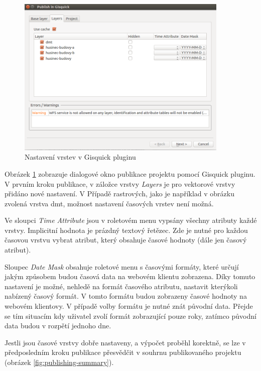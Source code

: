 \begin{figure}[h!]
\centering
\includegraphics[width=0.9\textwidth]{../img/gisquick-plugin.png}
\caption{Nastavení vrstev v Gisquick pluginu}
\label{fig:gisquick-plugin-layers}
\end{figure}

Obrázek \ref{fig:gisquick-plugin-layers} zobrazuje dialogové okno publikace
projektu pomocí Gisquick pluginu. V prvním kroku publikace, v záložce
vrstvy \textit{Layers} je pro vektorové vrstvy přidáno nové nastavení. V
Případě rastrových, jako je například v obrázku zvolená vrstva dmt,
možnost nastavení časových vrstev není možná.

Ve sloupci \textit{Time Attribute} jsou v roletovém menu vypsány
všechny atributy každé vrstvy. Implicitní hodnota je prázdný textový
řetězec. Zde je nutné pro každou časovou vrstvu vybrat atribut, který
obsahuje časové hodnoty (dále jen časový atribut).

Sloupec \textit{Date Mask} obsahuje roletové menu s časovými formáty,
které určují jakým způsobem budou časová data na webovém klientu
zobrazena. Díky tomuto nastavení je možné, nehledě na formát časového
atributu, nastavit kterýkoli nabízený časový formát. V tomto formátu
budou zobrazeny časové hodnoty na webovém klientovy. V případě volby
formátu je nutné znát původní data. Přejde se tím situacím kdy
uživatel zvolí formát zobrazující pouze roky, zatímco původní data
budou v rozpětí jednoho dne.

Jestli jsou časové vrstvy dobře nastaveny, a výpočet proběhl korektně,
se lze v předposledním kroku publikace přesvědčit v souhrnu publikovaného
projektu (obrázek \ref{fig:publishing-summary}).

